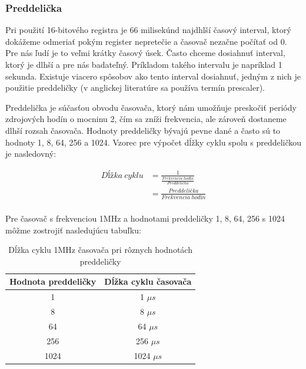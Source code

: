 \subsubsection{Preddelička}

Pri použití 16-bitového registra je 66 milisekúnd najdhlší časový interval, ktorý dokážeme odmeriať pokým register nepretečie a časovač nezačne počítať od 0.
Pre nás ľudí je to veľmi krátky časový úsek. Často chceme dosiahnuť interval, ktorý je dlhší a pre nás badateľný. Príkladom takého intervalu je  napríklad 1 sekunda. Existuje viacero spôsobov ako tento interval dosiahnuť, jedným z nich je použitie preddeličky (v anglickej literatúre sa používa termín prescaler).
\par
Preddelička je súčasťou obvodu časovača, ktorý nám umožňuje preskočiť periódy zdrojových hodín o mocninu 2, čím sa zníži frekvencia, ale zároveň dostaneme dlhší rozsah časovača.
Hodnoty preddeličky bývajú pevne dané a často sú to hodnoty 1, 8, 64, 256 a 1024. Vzorec pre výpočet dĺžky cyklu spolu s preddeličkou je nasledovný:

\begin{equation}
    \begin{aligned}
        Dĺžka\:cyklu & = \frac{1}{\frac{Frekvencia\:hodín}{Preddelička}} \\
                     & = \frac{Preddelička}{Frekvencia\:hodín}           \\
    \end{aligned}
\end{equation}

Pre časovač s frekvenciou 1MHz a hodnotami preddeličky 1, 8, 64, 256 s 1024 môžme zostrojiť nasledujúcu tabuľku:
\begin{table}[!htbp]
    \begin{center}
        \begin{tabular}{|c|c|}
            \hline
            Hodnota preddeličky & Dĺžka cyklu časovača \\
            \hline
            1                   & 1 $\mu s$            \\
            8                   & 8 $\mu s$            \\
            64                  & 64 $\mu s$           \\
            256                 & 256 $\mu s$          \\
            1024                & 1024 $\mu s$         \\
            \hline
        \end{tabular}
        \caption{Dĺžka cyklu 1MHz časovača pri rôznych hodnotách preddeličky}
        \label{table:timerPrescaler}
    \end{center}
\end{table}

